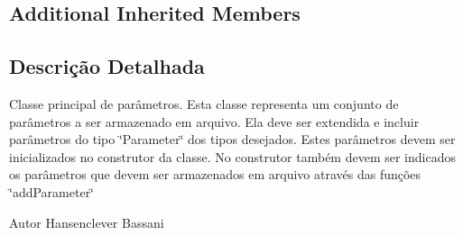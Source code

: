 \subsection*{Additional Inherited Members}


\subsection{Descrição Detalhada}
Classe principal de parâmetros. Esta classe representa um conjunto de parâmetros a ser armazenado em arquivo. Ela deve ser extendida e incluir parâmetros do tipo \char`\"{}\-Parameter\char`\"{} dos tipos desejados. Estes parâmetros devem ser inicializados no construtor da classe. No construtor também devem ser indicados os parâmetros que devem ser armazenados em arquivo através das funções \char`\"{}add\-Parameter\char`\"{} \begin{DoxyAuthor}{Autor}
Hansenclever Bassani 
\end{DoxyAuthor}


